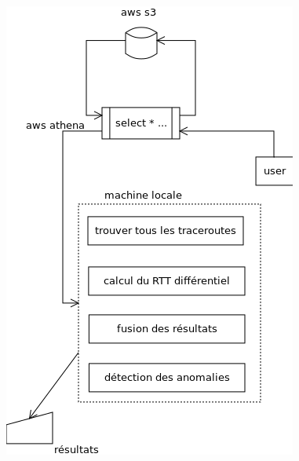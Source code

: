 \begin{figure}[H]
\centering
\includegraphics[width=1\linewidth]{illustrations/scenarios-before-after}
\caption{}
\label{fig:scenarios-before-after}
\end{figure}

